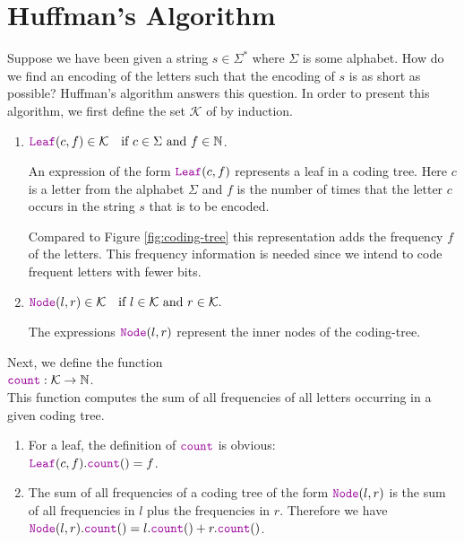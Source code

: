 \section{Huffman's Algorithm}
Suppose we have been given a string $s \in \Sigma^*$ where $\Sigma$ is some alphabet.  How do we find an encoding of the letters such 
that the encoding of $s$ is as short as possible?  Huffman's algorithm answers this question.  In order 
to present this algorithm, we first define the set $\mathcal{K}$ of  by induction.
\begin{enumerate}
\item $\mytt{Leaf}(c,f) \in \mathcal{K} \quad \mbox{if $c \in \Sigma$ and $f \in \N$}$.

      An expression of the form $\mytt{Leaf}(c,f)$ represents a leaf in a coding tree.  Here  $c$ is a letter
      from the alphabet $\Sigma$ and $f$ is the number of times that the letter $c$ occurs in the string $s$
      that is to be encoded.

      Compared to Figure \ref{fig:coding-tree} this representation adds the frequency $f$ of the letters.
      This frequency information is needed since we intend to code frequent letters with fewer bits.
\item $\mytt{Node}(l,r) \in \mathcal{K} \quad \mbox{if $l \in\mathcal{K}$ and $r \in \mathcal{K}$.}$ 

      The expressions $\mytt{Node}(l,r)$ represent the inner nodes of the coding-tree.
\end{enumerate}
Next, we define the function
\\[0.2cm]
\hspace*{1.3cm}
$\mytt{count} : \mathcal{K} \rightarrow \N$.
\\[0.2cm] 
This function computes the sum of all frequencies of all letters occurring in a given coding tree.
\begin{enumerate}
\item For a leaf, the definition of $\mytt{count}$ is obvious:
      \\[0.2cm]
      \hspace*{1.3cm}
      $\mytt{Leaf}(c,f).\mytt{count}() = f$.
\item The sum of all frequencies of a coding tree of the form $\mytt{Node}(l,r)$ is the sum of all frequencies
      in $l$ plus the frequencies in $r$.  Therefore we have
      \\[0.2cm]
      \hspace*{1.3cm}
      $\mytt{Node}(l,r).\mytt{count}() = l.\mytt{count}() + r.\mytt{count}()$. 
\end{enumerate}
